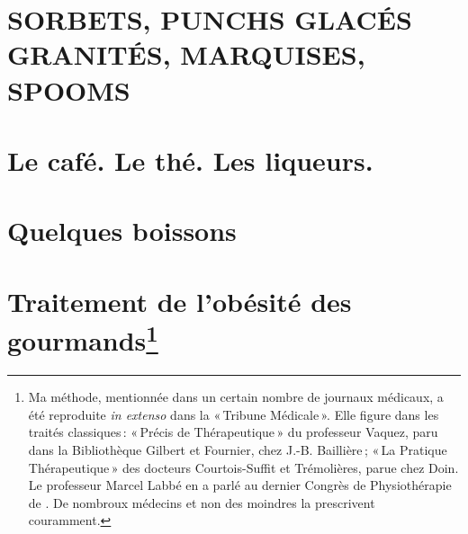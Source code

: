 \chapter*{\Large\sc\centering 
SORBETS, PUNCHS GLACÉS \\
GRANITÉS, MARQUISES, SPOOMS}


\chapter*{\centering Le café. Le thé. Les liqueurs.}


\chapter*{\centering Quelques boissons}


\chapter*{\centering Traitement de l'obésité des gourmands\footnote{Ma méthode,
mentionnée dans un certain nombre de journaux médicaux, a été reproduite
\textit{in extenso} dans la « Tribune Médicale ». Elle figure dans les traités
classiques : « Précis de Thérapeutique » du professeur Vaquez, paru dans la
Bibliothèque Gilbert et Fournier, chez J.-B. Baillière ; « La Pratique
Thérapeutique » des docteurs Courtois-Suffit et Trémolières, parue chez Doin.
Le professeur Marcel Labbé en a parlé au dernier Congrès de Physiothérapie de
{\mmm}. De nombroux médecins et non des moindres la prescrivent
couramment.}}

